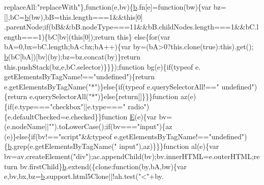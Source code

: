 \begin{DoxyCode}
      replaceAll:\textcolor{stringliteral}{"replaceWith"}\},\textcolor{keyword}{function}(e,bv)\{\hyperlink{jquery_8js_aa4026ad5544b958e54ce5e106fa1c805}{b}.fn[e]=\textcolor{keyword}{function}(bw)\{var bz=[],bC=\hyperlink{jquery_8js_aa4026ad5544b958e54ce5e106fa1c805}{b}(bw),bB=this.length===1&&\textcolor{keyword}{this}[0]
      .parentNode;\textcolor{keywordflow}{if}(bB&&bB.nodeType===11&&bB.childNodes.length===1&&bC.length===1)\{bC[bv](\textcolor{keyword}{this}[0]);\textcolor{keywordflow}{return} \textcolor{keyword}{this}\}\textcolor{keywordflow}{
      else}\{\textcolor{keywordflow}{for}(var bA=0,bx=bC.length;bA<bx;bA++)\{var by=(bA>0?this.clone(\textcolor{keyword}{true}):\textcolor{keyword}{this}).\textcolor{keyword}{get}();
      \hyperlink{jquery_8js_aa4026ad5544b958e54ce5e106fa1c805}{b}(bC[bA])[bv](by);bz=bz.concat(by)\}\textcolor{keywordflow}{return} this.pushStack(bz,e,bC.selector)\}\}\});\textcolor{keyword}{function} bg(e)\{\textcolor{keywordflow}{if}(typeof e.
      getElementsByTagName!==\textcolor{stringliteral}{"undefined"})\{\textcolor{keywordflow}{return} e.getElementsByTagName(\textcolor{stringliteral}{"*"})\}\textcolor{keywordflow}{else}\{\textcolor{keywordflow}{if}(typeof e.querySelectorAll!==\textcolor{stringliteral}{"
      undefined"})\{\textcolor{keywordflow}{return} e.querySelectorAll(\textcolor{stringliteral}{"*"})\}\textcolor{keywordflow}{else}\{\textcolor{keywordflow}{return}[]\}\}\}\textcolor{keyword}{function} az(e)\{\textcolor{keywordflow}{if}(e.type===\textcolor{stringliteral}{"checkbox"}||e.type===\textcolor{stringliteral}{"
      radio"})\{e.defaultChecked=e.checked\}\}\textcolor{keyword}{function} \hyperlink{_l_c_d_8c_a07484107e6d9fdf38b53edf631d6511d}{E}(e)\{var bv=(e.nodeName||\textcolor{stringliteral}{""}).toLowerCase();\textcolor{keywordflow}{if}(bv===\textcolor{stringliteral}{"input"})\{az
      (e)\}\textcolor{keywordflow}{else}\{\textcolor{keywordflow}{if}(bv!==\textcolor{stringliteral}{"script"}&&typeof e.getElementsByTagName!==\textcolor{stringliteral}{"undefined"})\{\hyperlink{jquery_8js_aa4026ad5544b958e54ce5e106fa1c805}{b}.grep(e.getElementsByTagName(\textcolor{stringliteral}{"
      input"}),az)\}\}\}\textcolor{keyword}{function} al(e)\{var bv=av.createElement(\textcolor{stringliteral}{"div"});ac.appendChild(bv);bv.innerHTML=e.outerHTML;\textcolor{keywordflow}{return} 
      bv.firstChild\}\hyperlink{jquery_8js_aa4026ad5544b958e54ce5e106fa1c805}{b}.extend(\{clone:\textcolor{keyword}{function}(by,bA,bw)\{var e,bv,bx,bz=\hyperlink{jquery_8js_aa4026ad5544b958e54ce5e106fa1c805}{b}.support.html5Clone||!ah.test(\textcolor{stringliteral}{"<"}+by.

\end{DoxyCode}
